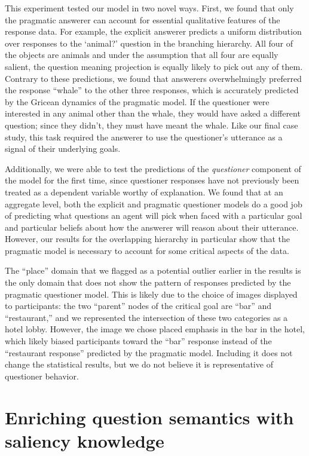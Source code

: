 \documentclass[12pt, floatsintext, jou]{apa6}
\begin{document}
This experiment tested our model in two novel ways. First, we found that only the pragmatic answerer can account for essential qualitative features of the response data. For example, the explicit answerer predicts a uniform distribution over responses to the `animal?' question in the branching hierarchy. All four of the objects are animals and under the assumption that all four are equally salient, the question meaning projection is equally likely to pick out any of them. Contrary to these predictions, we found that answerers overwhelmingly preferred the response ``whale'' to the other three responses, which is accurately predicted by the Gricean dynamics of the pragmatic model. If the questioner were interested in any animal other than the whale, they would have asked a different question; since they didn't, they must have meant the whale. Like our final case study, this task required the answerer to use the questioner's utterance as a signal of their underlying goals.

Additionally, we were able to test the predictions of the \emph{questioner} component of the model for the first time, since questioner responses have not previously been treated as a dependent variable worthy of explanation. We found that at an aggregate level, both the explicit and pragmatic questioner models do a good job of predicting what questions an agent will pick when faced with a particular goal and particular beliefs about how the answerer will reason about their utterance. However, our results for the overlapping hierarchy in particular show that the pragmatic model is necessary to account for some critical aspects of the data. 

The ``place'' domain that we flagged as a potential outlier earlier in the results is the only domain that does not show the pattern of responses predicted by the pragmatic questioner model. This is likely due to the choice of images displayed to participants: the two ``parent'' nodes of the critical goal are ``bar'' and ``restaurant,'' and we represented the intersection of these two categories as a hotel lobby. However, the image we chose placed emphasis in the bar in the hotel, which likely biased participants toward the ``bar'' response instead of the ``restaurant response'' predicted by the pragmatic model. Including it does not change the statistical results, but we do not believe it is representative of questioner behavior. 

\section{Enriching question semantics with saliency knowledge}
\end{document}
